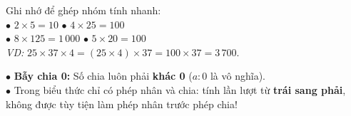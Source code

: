 \documentclass[14pt,a4paper,oneside]{extbook}
\begin{document}
\noindent
\begin{minipage}[t]{0.52\textwidth}
  \begin{tcolorbox}[
    enhanced,
    title={\footnotesize\bfseries\color{white}\faBolt\ Các cặp số ``vàng'' khi nhân nhẩm},
    colback=green!3!white,
    colframe=green!60!black,
    arc=2.5mm, boxrule=0.8pt, top=1.8mm, bottom=1.8mm, left=2.2mm, right=2.2mm
  ]
    \footnotesize
    Ghi nhớ để ghép nhóm tính nhanh:\\
    $\bullet$ $2 \times 5 = 10$ \qquad $\bullet$ $4 \times 25 = 100$\\
    $\bullet$ $8 \times 125 = 1\,000$ \quad $\bullet$ $5 \times 20 = 100$\\
    \textit{VD:} $25 \times 37 \times 4 = (25 \times 4) \times 37 = 100 \times 37 = 3\,700$.
  \end{tcolorbox}
\end{minipage}%
\hfill
\begin{minipage}[t]{0.46\textwidth}
  \begin{tcolorbox}[
    enhanced,
    title={\footnotesize\bfseries\color{white}\faExclamationTriangle\ Mẹo tránh bẫy trắc nghiệm},
    colback=red!2!white,
    colframe=red!70!black,
    arc=2.5mm, boxrule=0.8pt, top=1.8mm, bottom=1.8mm, left=2.2mm, right=2.2mm
  ]
    \footnotesize
    $\bullet$ \textbf{Bẫy chia 0:} Số chia luôn phải \textbf{khác 0} ($a : 0$ là vô nghĩa).\\
    $\bullet$ Trong biểu thức chỉ có phép nhân và chia: tính lần lượt từ \textbf{trái sang phải}, không được tùy tiện làm phép nhân trước phép chia!
  \end{tcolorbox}
\end{minipage}
\end{document}
